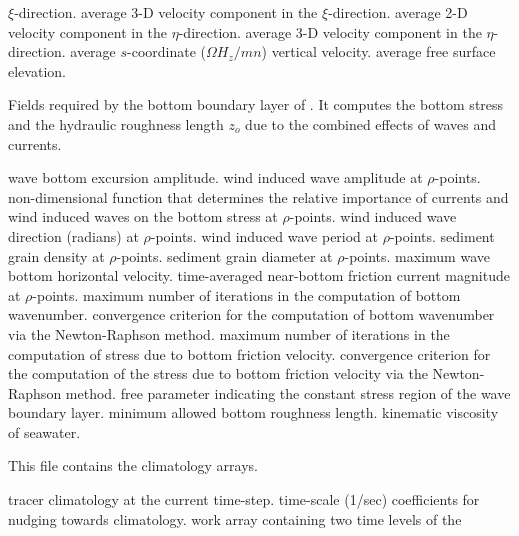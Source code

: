 \begin{klist}
\begin{klist}
  $\xi$-direction.
           average 3-D velocity component in the
  $\xi$-direction.
           average 2-D velocity component in the
  $\eta$-direction.
           average 3-D velocity component in the
  $\eta$-direction.
           average $s$-coordinate ($\Omega H_z/mn$)
vertical velocity.
          average free surface elevation.
    \end{klist}
    Fields required by the bottom boundary layer of
  \citet{Styles96}.  It computes the bottom stress and
  the hydraulic roughness length $z_o$ due to the combined effects of
  waves and currents.
    \begin{klist}
                wave bottom excursion amplitude.
             wind induced wave amplitude at $\rho$-points.
                non-dimensional function that determines the
    relative importance of currents and wind induced waves on the bottom
    stress at $\rho$-points.
             wind induced wave direction (radians) at
    $\rho$-points.
             wind induced wave period at $\rho$-points.
             sediment grain density at $\rho$-points.
             sediment grain diameter at $\rho$-points.
                maximum wave bottom horizontal velocity.
            time-averaged near-bottom friction current
    magnitude at $\rho$-points.
          maximum number of iterations in the
    computation of bottom wavenumber.
           convergence criterion for the computation of
   bottom wavenumber via the Newton-Raphson method.
          maximum number of iterations in the
   computation of stress due to bottom friction velocity.
           convergence criterion for the computation
   of the stress due to bottom friction velocity via the
   Newton-Raphson method.
          free parameter indicating the constant
   stress region of the wave boundary layer.
         minimum allowed bottom roughness length.
             kinematic viscosity of seawater.
    \end{klist}
    This file contains the climatology arrays.
    \begin{klist}
              tracer climatology at the current time-step.
           time-scale (1/sec) coefficients for nudging
    towards climatology.
            work array containing two time levels of the

\end{klist}
\end{klist}
